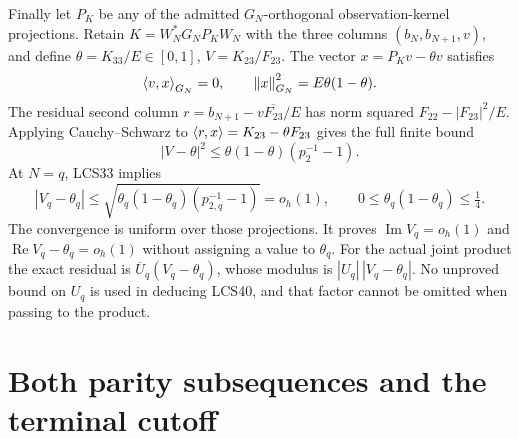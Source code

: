 Finally let $P_K$ be any of the admitted $G_N$-orthogonal
observation-kernel projections. Retain
$K=W_N^*G_NP_KW_N$ with the three columns
$(b_N,b_{N+1},v)$, and define
$\theta=K_{33}/E\in[0,1]$, $V=K_{23}/F_{23}$.
The vector $x=P_Kv-\theta v$ satisfies
\[
 \ip v x_{G_N}=0,\qquad\norm x_{G_N}^2=E\theta(1-\theta).
\]
The residual second column
$r=b_{N+1}-v\overline{F_{23}}/E$ has norm squared
$F_{22}-|F_{23}|^2/E$. Applying Cauchy--Schwarz to
$\left\langle r,x\right\rangle=K_{23}-\theta F_{23}$ gives the full finite bound
\begin{equation}\tag{LCS39}
 \boxed{|V-\theta|^2\le\theta(1-\theta)(p_2^{-1}-1).}
\end{equation}
At $N=q$, LCS33 implies
\begin{equation}\tag{LCS40}
 |V_q-\theta_q|\le
 \sqrt{\theta_q(1-\theta_q)(p_{2,q}^{-1}-1)}=o_h(1),
 \qquad 0\le\theta_q(1-\theta_q)\le\tfrac14.
\end{equation}
The convergence is uniform over those projections. It proves
$\operatorname{Im}V_q=o_h(1)$ and
$\operatorname{Re}V_q-\theta_q=o_h(1)$ without assigning a value
to $\theta_q$. For the actual joint product the exact residual is
$\overline U_q(V_q-\theta_q)$, whose modulus is
$|U_q|\,|V_q-\theta_q|$. No unproved bound on $U_q$ is used in
deducing LCS40, and that factor cannot be omitted when passing
to the product.



\endgroup

\clearpage
\begingroup
\def\C{\mathbb C}
\def\R{\mathbb R}
\def\PP{\mathcal P}
\def\norm#1{\left\lVert#1\right\rVert}
\def\Tr{\operatorname{Tr}}

\setcounter{equation}{0}
\renewcommand{\theequation}{A04RBE.\arabic{equation}}
\section*{Both parity subsequences and the terminal cutoff}


\begin{abstract}
The two boundary projection energies in the original response ellipse
are evaluated through the full retained eigenclass, its consecutive
Cauchy transforms, and its actual source-norm drops. The eigen-equation
determines the complete opposite-parity masses. Their exact transport
between adjacent attained sections expresses each class-norm drop in
the original directed phase errors. Together with the original
arithmetic covariance and multiplication estimates, this proves
\(p_2=\Theta_h(a^2/q^2)\) on the even cutoff subsequence and
\(p_1=O_h(q^{-2})\) on the odd subsequence, with explicit finite
bounds and complete primary multiplicity retained. The same directed
error extends to the previously uncovered final receiving cutoff.
The observation-kernel projection remains its original map; none
of its individual projected signs is inferred from these energies.
\end{abstract}

